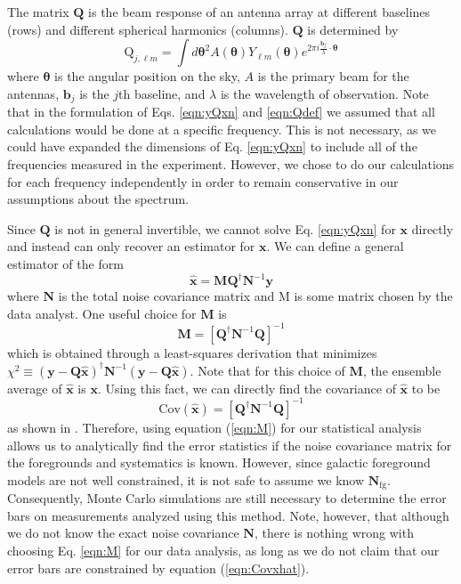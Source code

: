\documentclass[twolcolumn,apj]{emulateapj}
\newcommand{\y}{\mathbf{y}}
\newcommand{\N}{\mathbf{N}}
\newcommand{\Q}{\mathbf{Q}}
\newcommand{\M}{\mathbf{M}}
\begin{document}
The matrix $\Q$ is the beam response of an antenna array at different baselines (rows) and different spherical harmonics (columns). $\Q$ is determined by 
\begin{equation}
\textrm{Q}_{j,\ell m} = \int d \boldsymbol \theta^2 A(\boldsymbol \theta) Y_{\ell m}(\boldsymbol \theta) e^{2\pi i \frac{\mathbf{b_\textit{j}}}{\lambda} \cdot \boldsymbol \theta}
\label{eqn:Qdef}
\end{equation}
where $\boldsymbol \theta$ is the angular position on the sky, $A$ is the primary beam for the antennas, $\mathbf{b_{\textit{j}}}$ is the $j$th baseline, and $\lambda$ is the wavelength of observation. Note that in the formulation of Eqs. \eqref{eqn:yQxn} and \eqref{eqn:Qdef} we assumed that all calculations would be done at a specific frequency. This is not necessary, as we could have expanded the dimensions of Eq. \eqref{eqn:yQxn} to include all of the frequencies measured in the experiment. However, we chose to do our calculations for each frequency independently in order to remain conservative in our assumptions about the spectrum.

Since $\Q$ is not in general invertible, we cannot solve Eq. \eqref{eqn:yQxn} for $\mathbf{x}$ directly and instead can only recover an estimator for $\mathbf{x}$. We can define a general estimator of the form 
\begin{equation}
\mathbf{\hat x} = \M \Q^\dagger \N^{-1} \y
\label{eqn:xhat}
\end{equation}
where $\N$ is the total noise covariance matrix and M is some matrix chosen by the data analyst. One useful choice for $\M$ is 
\begin{equation}
\M = [\Q^\dagger \N^{-1} \Q]^{-1}
\label{eqn:M}
\end{equation}
which is obtained through a least-squares derivation that minimizes $\chi^2 \equiv (\y-\Q \mathbf{\hat x})^\dagger \N^{-1} (\y-\Q \mathbf{\hat x})$. Note that for this choice of $\M$, the ensemble average of $\mathbf{\hat x}$ is $\mathbf{x}$.
Using this fact, we can directly find the covariance of $\mathbf{\hat x}$ to be 
\begin{equation}
\textrm{Cov}(\mathbf{\hat x}) = [\Q^\dagger \N^{-1} \Q]^{-1}
\label{eqn:Covxhat}
\end{equation}
as shown in \citet{Tegmark_CMB_maps_wli}. Therefore, using equation (\ref{eqn:M}) for our statistical analysis allows us to analytically find the error statistics if the noise covariance matrix for the foregrounds and systematics is known. However, since galactic foreground models are not well constrained, it is not safe to assume we know $\N_{\textrm{fg}}$. Consequently, Monte Carlo simulations are still necessary to determine the error bars on measurements analyzed using this method. Note, however, that although we do not know the exact noise covariance $\N$, there is nothing wrong with choosing Eq. \eqref{eqn:M} for our data analysis, as long as we do not claim that our error bars are constrained by equation (\ref{eqn:Covxhat}). %
\end{document}
